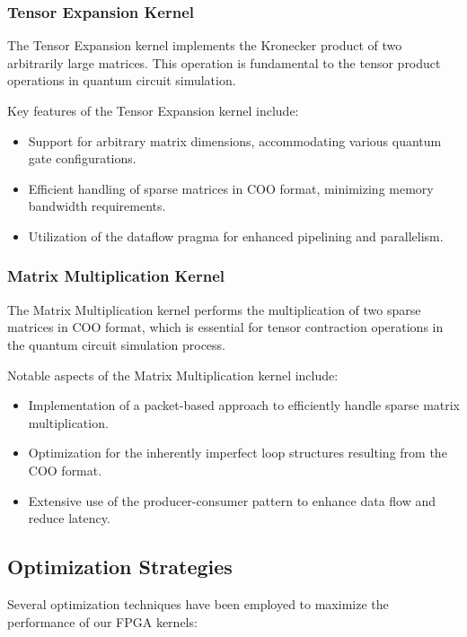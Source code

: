 \documentclass[12pt,oneside,a4paper]{article}
\begin{document}
\subsubsection{Tensor Expansion Kernel}

The Tensor Expansion kernel implements the Kronecker product of two arbitrarily large matrices. This operation is fundamental to the tensor product operations in quantum circuit simulation.

Key features of the Tensor Expansion kernel include:

\begin{itemize}
    \item Support for arbitrary matrix dimensions, accommodating various quantum gate configurations.
    \item Efficient handling of sparse matrices in COO format, minimizing memory bandwidth requirements.
    \item Utilization of the dataflow pragma for enhanced pipelining and parallelism.
\end{itemize}

\subsubsection{Matrix Multiplication Kernel}

The Matrix Multiplication kernel performs the multiplication of two sparse matrices in COO format, which is essential for tensor contraction operations in the quantum circuit simulation process.

Notable aspects of the Matrix Multiplication kernel include:

\begin{itemize}
    \item Implementation of a packet-based approach to efficiently handle sparse matrix multiplication.
    \item Optimization for the inherently imperfect loop structures resulting from the COO format.
    \item Extensive use of the producer-consumer pattern to enhance data flow and reduce latency.
\end{itemize}

\subsection{Optimization Strategies}

Several optimization techniques have been employed to maximize the performance of our FPGA kernels:
\end{document}
